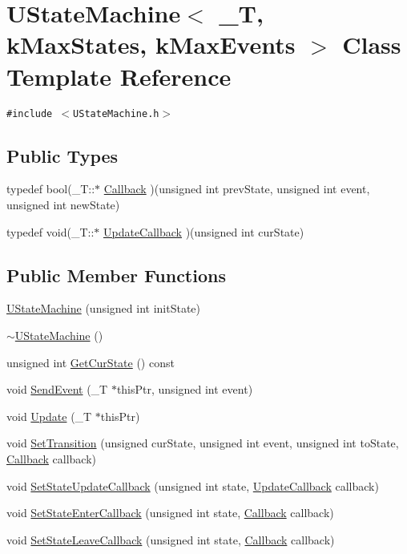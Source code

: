 \hypertarget{class_u_state_machine}{
\section{UStateMachine$<$ \_\-T, kMaxStates, kMaxEvents $>$ Class Template Reference}
\label{class_u_state_machine}
}
{\tt \#include $<$UStateMachine.h$>$}

\subsection*{Public Types}
\begin{CompactItemize}
\item 
typedef bool(\_\-T::$\ast$ \hyperlink{class_u_state_machine_963f51f22ea58913720e723b793db8f2}{Callback} )(unsigned int prevState, unsigned int event, unsigned int newState)
\item 
typedef void(\_\-T::$\ast$ \hyperlink{class_u_state_machine_15216ad4481a4d78546f59992e7aaffc}{UpdateCallback} )(unsigned int curState)
\end{CompactItemize}
\subsection*{Public Member Functions}
\begin{CompactItemize}
\item 
\hyperlink{class_u_state_machine_482d71ab249a93962a3e969c7cb8820b}{UStateMachine} (unsigned int initState)
\item 
\hyperlink{class_u_state_machine_55bfac71d1d2793f130f351151e12768}{$\sim$UStateMachine} ()
\item 
unsigned int \hyperlink{class_u_state_machine_74c99f3a70fa39b073a5aad8df25e4ed}{GetCurState} () const 
\item 
void \hyperlink{class_u_state_machine_cbcab43339103431455ce82c9e059f90}{SendEvent} (\_\-T $\ast$thisPtr, unsigned int event)
\item 
void \hyperlink{class_u_state_machine_bf82a8c4731c6c736782ea9f2ccac1b4}{Update} (\_\-T $\ast$thisPtr)
\item 
void \hyperlink{class_u_state_machine_eb4c6dc6eaef564984dff22a2defe593}{SetTransition} (unsigned curState, unsigned int event, unsigned int toState, \hyperlink{class_u_state_machine_963f51f22ea58913720e723b793db8f2}{Callback} callback)
\item 
void \hyperlink{class_u_state_machine_4ad66bcfa1dd9b29fedccc5ee19d5a1d}{SetStateUpdateCallback} (unsigned int state, \hyperlink{class_u_state_machine_15216ad4481a4d78546f59992e7aaffc}{UpdateCallback} callback)
\item 
void \hyperlink{class_u_state_machine_a19a8b515f8343a99a6017c1dadf4d90}{SetStateEnterCallback} (unsigned int state, \hyperlink{class_u_state_machine_963f51f22ea58913720e723b793db8f2}{Callback} callback)
\item 
void \hyperlink{class_u_state_machine_b96d528933ba715d5a75d5f42cd193e0}{SetStateLeaveCallback} (unsigned int state, \hyperlink{class_u_state_machine_963f51f22ea58913720e723b793db8f2}{Callback} callback)
\end{CompactItemize}



